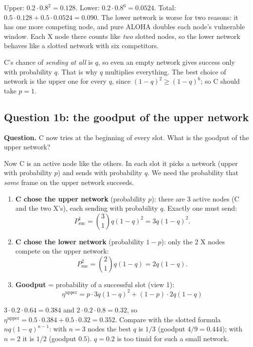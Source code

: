\begin{example}[Numbers: $p=0.5$, $q=0.2$]
Upper: $0.2\cdot0.8^2 = 0.128$. Lower: $0.2\cdot0.8^6 = 0.0524$. Total: $0.5\cdot0.128+0.5\cdot0.0524 = 0.090$.
The lower network is worse for two reasons: it has one more competing node, and pure ALOHA doubles each node's vulnerable window. Each X node there counts like \emph{two} slotted nodes,
so the lower network behaves like a slotted network with six competitors.
\end{example}

\begin{pitfall}[C's own $q$]
C's chance of \emph{sending at all} is $q$, so even an empty network gives success only with probability $q$. That is why $q$ multiplies everything. The best choice of network is the upper one for every $q$, since $(1-q)^2\ge(1-q)^6$; so C should take $p=1$.
\end{pitfall}

\subsection*{Question 1b: the goodput of the upper network}
\textbf{Question.} C now tries at the beginning of every slot. What is the goodput of the upper network?


Now C is an active node like the others. In each slot it picks a network (upper with probability $p$) and sends with probability $q$. We need the probability that \emph{some} frame on the upper network succeeds.

\begin{enumerate}
  \item \textbf{C chose the upper network} (probability $p$): there are 3 active nodes (C and the two X's), each sending with probability $q$. Exactly one must send:
        \[ P^{1}_{\text{suc}} = \binom31 q(1-q)^2 = 3q(1-q)^2. \]
  \item \textbf{C chose the lower network} (probability $1-p$): only the 2 X nodes compete on the upper network:
        \[ P^{2}_{\text{suc}} = \binom21 q(1-q) = 2q(1-q). \]
  \item \textbf{Goodput} = probability of a successful slot (view 1):
        \[ \boxed{\ \eta^{\text{upper}} = p\cdot3q(1-q)^2 + (1-p)\cdot2q(1-q)\ } \]
\end{enumerate}

\begin{example}[Numbers: $p=0.5$, $q=0.2$]
$3\cdot0.2\cdot0.64 = 0.384$ and $2\cdot0.2\cdot0.8 = 0.32$, so $\eta^{\text{upper}} = 0.5\cdot0.384+0.5\cdot0.32 = 0.352$.
Compare with the slotted formula $nq(1-q)^{n-1}$: with $n=3$ nodes the best $q$ is $1/3$ (goodput $4/9 = 0.444$); with $n=2$ it is $1/2$ (goodput $0.5$). $q = 0.2$ is too timid for such a small network.
\end{example}

